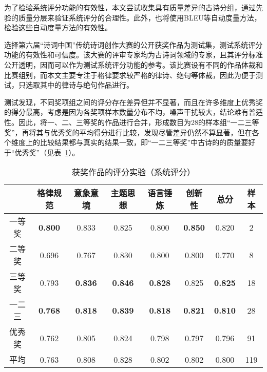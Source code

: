 为了检验系统评分功能的有效性，本文尝试收集具有质量差异的古诗分组，通过先验的质量分层来验证系统评分的合理性。此外，也将使用BLEU等自动度量方法，检验这些自动度量方法的有效性。

选择第六届“诗词中国”传统诗词创作大赛的公开获奖作品为测试集，测试系统评分功能的有效性和可信度。该大赛的评审专家均为古诗词领域的专家，且其评分标准公开透明，因而可以作为测试系统评分功能的参考。该比赛设有不同的作品体裁和比赛组别，而本文主要专注于格律要求较严格的律诗、绝句等体裁，因此为便于测试，只选取其中的律诗与绝句作品进行。%

测试发现，不同奖项组之间的评分存在差异但并不显著，而且在许多维度上优秀奖的得分最高，考虑是因为各奖项样本数量分布不均，噪声干扰较大，结论难有普适性。因此，将一、二、三等奖的作品进行合并，形成数目为28的样本组“一二三等奖”，再将其与优秀奖的平均得分进行比较，发现尽管差异仍然不算显著，但在各个维度上的比较结果都与真实的结果一致，即“一二三等奖”中古诗的的质量要好于“优秀奖”（见表~\ref{tab:test_scoring_prized_dsr1_detail}）。

\begin{table}[ht]
  \centering
  \caption{获奖作品的评分实验（系统评分）}
  \label{tab:test_scoring_prized_dsr1_detail}
  \begin{tabular}{cccccccc}
      \toprule
      &格律规范& 意象意境& 主题思想& 语言锤炼&创新性& 总分&样本\\
      \midrule
      一等奖	&	\textbf{0.800} &	0.833 &	0.825 &	0.800 &	\textbf{0.850} &	0.820 &	2	\\
      二等奖	&	0.696 	&	0.767 	&	0.830 	&	0.800 	&	0.800 	&	0.770 	&	8	\\
      三等奖	&	0.793 	&	\textbf{0.836} 	&	\textbf{0.846} 	&	\textbf{0.828} 	&	0.825 	&	\textbf{0.825} 	&	18	\\
      \cmidrule{2-7} %
      一二三	&	\textbf{0.768} 	&	\textbf{0.818} 	&	\textbf{0.839} 	&	\textbf{0.818} 	&	\textbf{0.821} 	&	\textbf{0.810} 	&	28	\\
      优秀奖	&	0.762 	&	0.805 	&	0.824 	&	0.798 	&	0.797 	&	0.796 	&	91	\\
      \cmidrule{2-7} %
      平均	&	0.763 	&	0.808 	&	0.828 	&	0.802 	&	0.802 	&	0.800 	&	119	\\
      \bottomrule
  \end{tabular}
\end{table}


